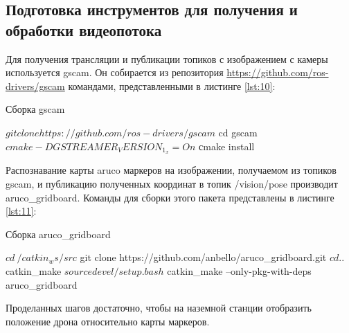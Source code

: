 \subsection{Подготовка инструментов для получения и обработки видеопотока}
Для получения трансляции и публикации топиков с изображением с камеры используется gscam. Он собирается из репозитория \url{https://github.com/ros-drivers/gscam} командами, представленными в листинге \ref{lst:10}:
\begin{Program}[H]
	\caption{Сборка gscam} \label{lst:10}
	\begin{MyCode}
	$ git clone https://github.com/ros-drivers/gscam
	$ cd gscam
	$ cmake -DGSTREAMER_VERSION_1_x=On
	$ сmake install
	\end{MyCode}
\end{Program}

Распознавание карты aruco маркеров на изображении, получаемом из топиков gscam, и публикацию полученных координат в топик /vision/pose производит aruco\_gridboard. Команды для сборки этого пакета представлены в листинге \ref{lst:11}:
\begin{Program}[H]
	\caption{Сборка aruco\_gridboard} \label{lst:11}
	\begin{MyCode}	
	$ cd ~/catkin_ws/src
	$ git clone https://github.com/anbello/aruco_gridboard.git
	$ cd ..
	$ catkin_make
	$ source devel/setup.bash
	$ catkin_make --only-pkg-with-deps aruco_gridboard
	\end{MyCode}
\end{Program}

Проделанных шагов достаточно, чтобы на наземной станции отобразить положение дрона относительно карты маркеров.